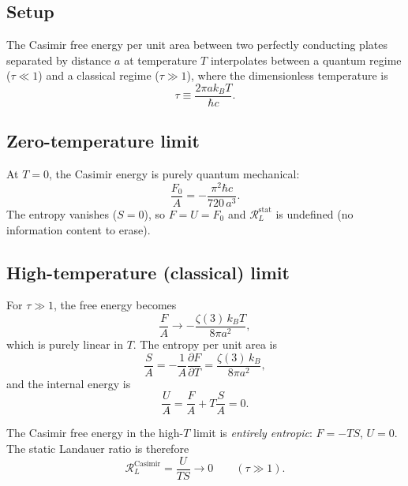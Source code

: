 \documentclass[%
 aip,
 amsmath,amssymb,
 reprint,%
]{revtex4-2}
\newcommand{\RLs}{\mathcal{R}_L^{\mathrm{stat}}}
\begin{document}
\subsection{Setup}

The Casimir free energy per unit area between two perfectly conducting
plates separated by distance $a$ at temperature $T$ interpolates
between a quantum regime ($\tau \ll 1$) and a classical regime
($\tau \gg 1$), where the dimensionless temperature is
\begin{equation}
\tau \equiv \frac{2\pi a k_B T}{\hbar c}.
\end{equation}

\subsection{Zero-temperature limit}

At $T = 0$, the Casimir energy is purely quantum mechanical:
\begin{equation}
\frac{F_0}{A} = -\frac{\pi^2 \hbar c}{720\, a^3}.
\end{equation}
The entropy vanishes ($S = 0$), so $F = U = F_0$ and $\RLs$
is undefined (no information content to erase).

\subsection{High-temperature (classical) limit}

For $\tau \gg 1$, the free energy becomes~\cite{Lifshitz1956}
\begin{equation}
\frac{F}{A} \to -\frac{\zeta(3)\, k_B T}{8\pi a^2},
\end{equation}
which is purely linear in $T$.  The entropy per unit area is
\begin{equation}
\frac{S}{A} = -\frac{1}{A}\frac{\partial F}{\partial T}
= \frac{\zeta(3)\, k_B}{8\pi a^2},
\end{equation}
and the internal energy is
\begin{equation}
\frac{U}{A} = \frac{F}{A} + T\frac{S}{A} = 0.
\end{equation}

The Casimir free energy in the high-$T$ limit is \emph{entirely
entropic}: $F = -TS$, $U = 0$.  The static Landauer ratio is
therefore
\begin{equation}
\mathcal{R}_L^{\mathrm{Casimir}} = \frac{U}{T S} \to 0
\qquad (\tau \gg 1).
\end{equation}
\end{document}
